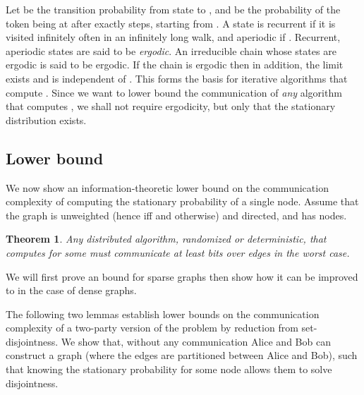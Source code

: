 \documentclass[twocolumn]{article}
\newtheorem{theorem}{Theorem}
\begin{document}
Let  be the transition probability from state  to , and  be the probability of the token being at  after exactly  steps, starting from . A state  is recurrent if it is visited infinitely often in an infinitely long walk, and aperiodic if . Recurrent, aperiodic states are said to be {\em ergodic}. An irreducible chain whose states are ergodic is said to be ergodic. If the chain is ergodic then in addition, the limit  exists and is independent of . This forms the basis for iterative algorithms that compute . Since we want to lower bound the communication of {\em any} algorithm that computes , we shall not require ergodicity, but only that the stationary distribution  exists.

\subsection{Lower bound}
We now show an information-theoretic lower bound on the communication complexity of computing the stationary probability of a single node. Assume that the graph  is unweighted (hence  iff  and  otherwise) and directed, and has  nodes.
\begin{theorem}
Any distributed algorithm, randomized or deterministic, that computes 
for some  must communicate at least  bits over 
edges in the worst case.
\label{thm:main}
\end{theorem}
We will first prove an  bound for sparse graphs then show
how it can be improved to  in the case of dense graphs.

The following two lemmas establish lower bounds on the communication complexity of a two-party version of the problem by reduction from set-disjointness. We show that, without any communication Alice and Bob can construct a graph  (where the edges are partitioned between Alice and Bob), such that knowing the stationary probability  for some node  allows them to solve disjointness.
\end{document}
